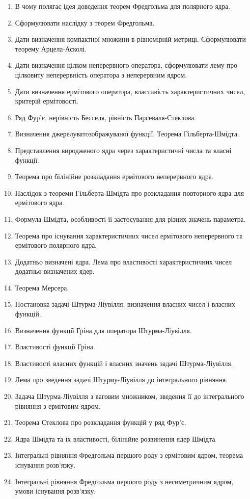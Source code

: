 \begin{enumerate}
	\item В чому полягає ідея доведення теорем Фредгольма для полярного ядра.
	\item Сформулювати наслідку з теорем Фредгольма.
	\item Дати визначення компактної множини в рівномірній метриці. Сформулювати теорему Арцела-Асколі.
	\item Дати визначення цілком неперервного оператора, сформулювати лему про цілковиту неперервність оператора з неперервним ядром.
	\item Дати визначення ермітового оператора, властивість характеристичних чисел, критерій ермітовості.
	\item Ряд Фур'є, нерівність Бесселя, рівність Парсеваля-Стеклова.
	\item Визначення джерелуватозображуваної функції. Теорема Гільберта-Шмідта.
	\item Представлення виродженого ядра через характеристичні числа та власні функції.
	\item Теорема про білінійне розкладання ермітового неперервного ядра.
	\item Наслідок з теореми Гільберта-Шмідта про розкладання повторного ядра для ермітового ядра.
	\item Формула Шмідта, особливості її застосування для різних значень параметра.
	\item Теорема про існування характеристичних чисел ермітового неперервного та ермітового полярного ядра.
	\item Додатньо визначені ядра. Лема про властивості характеристичних чисел додатньо визначених ядер.
	\item Теорема Мерсера.
	\item Постановка задачі Штурма-Ліувілля, визначення власних чисел і власних функцій.
	\item Визначення функції Гріна для оператора Штурма-Ліувілля.
	\item Властивості функції Гріна.
	\item Властивості власних функцій і власних значень задачі Штурма-Ліувілля.
	\item Лема про зведення задачі Штурму-Ліувілля до інтегрального рівняння.
	\item Задача Штурма-Ліувілля з ваговим множником, зведення її до інтегрального рівняння з ермітовим ядром.
	\item Теорема Стеклова про розкладання функцій у ряд Фур'є.
	\item Ядра Шмідта та їх властивості, білінійне розвинення ядер Шмідта.
	\item Інтегральні рівняння Фредгольма першого роду з ермітовим ядром, теорема існування розв'язку.
	\item Інтегральні рівняння Фредгольма першого роду з несиметричним ядром, умови існування розв'язку.
\end{enumerate}
